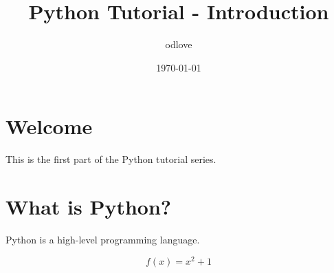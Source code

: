 \documentclass{article}
\begin{document}
\title{Python Tutorial - Introduction}
\author{odlove}
\date{\today}
\maketitle

\section{Welcome}

This is the first part of the Python tutorial series.

\section{What is Python?}

Python is a high-level programming language.

\[
f(x) = x^2 + 1
\]
\end{document}
